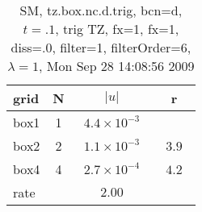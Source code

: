 \begin{table}[hbt]\tableFont %
\begin{center}
\begin{tabular}{|l|c|c|c|} \hline 
grid  & N &  $\vert u \vert$   & r \\ \hline 
                box1 &     1 & ~$4.4\times10^{ -3}$~ &            \\ \hline
                box2 &     2 & ~$1.1\times10^{ -3}$~ & ~$  3.9$~  \\ \hline
                box4 &     4 & ~$2.7\times10^{ -4}$~ & ~$  4.2$~  \\ \hline
    rate             &       &       $2.00$         &        \\ \hline
\end{tabular}
\caption{SM, tz.box.nc.d.trig, bcn=d, $t=.1$, trig TZ, fx=1, fx=1, diss=.0, filter=1, filterOrder=6, $\lambda=1$, Mon Sep 28 14:08:56 2009}\label{table:tz.box.nc.d.trig}
\end{center}
\end{table}
